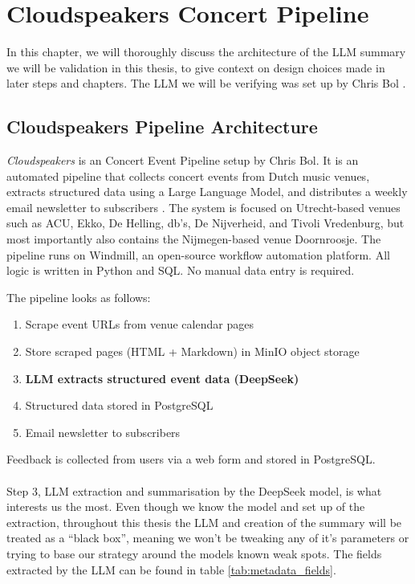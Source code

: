 \chapter{Cloudspeakers Concert Pipeline}\label{Newsletter}
\noindent In this chapter, we will thoroughly discuss the architecture of the LLM summary we will be validation in this thesis, to give context on design choices made in later steps and chapters. The LLM we will be verifying was set up by Chris Bol \cite{bol2026cloudspeakers}. 

\section{Cloudspeakers Pipeline Architecture}
\textit{Cloudspeakers} is an Concert Event Pipeline setup by Chris Bol. It is an automated pipeline that collects concert events from Dutch music
venues, extracts structured data using a Large Language Model, and distributes a
weekly email newsletter to subscribers \cite{bol2026cloudspeakers}. The system is focused on Utrecht-based
venues such as ACU, Ekko, De Helling, db's, De Nijverheid, and Tivoli Vredenburg, but most importantly also contains the Nijmegen-based venue Doornroosje.
The pipeline runs on Windmill, an open-source workflow automation platform. All
logic is written in Python and SQL. No manual data entry is required.

\noindent The pipeline looks as follows: 
\begin{enumerate}
    \item Scrape event URLs from venue calendar pages
    \item Store scraped pages (HTML + Markdown) in MinIO object storage
    \item\textbf{ LLM extracts structured event data (DeepSeek)}  
    \item Structured data stored in PostgreSQL
    \item Email newsletter to subscribers 
\end{enumerate}
Feedback is collected from users via a web form and stored in PostgreSQL. \\\\ 

\noindent Step 3, LLM extraction and summarisation by the DeepSeek model, is what interests us the most. Even though we know the model and set up of the extraction, throughout this thesis the LLM and creation of the summary will be treated as a ``black box'', meaning we won't be tweaking any of it's parameters or trying to base our strategy around the models known weak spots. 
The fields extracted by the LLM can be found in table \ref{tab:metadata_fields}.  

